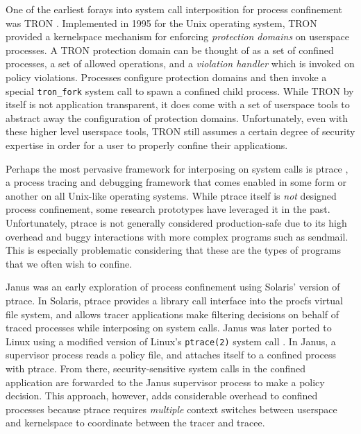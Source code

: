 \documentclass[dvipsnames, 12pt]{article}
\begin{document}
One of the earliest forays into system call interposition for process
confinement was TRON \cite{berman1995_tron}. Implemented in 1995 for the Unix
operating system, TRON provided a kernelspace mechanism for enforcing
\textit{protection domains} on userspace processes. A TRON protection domain can
be thought of as a set of confined processes, a set of allowed operations, and
a \textit{violation handler} which is invoked on policy violations. Processes
configure protection domains and then invoke a special \texttt{tron\_fork}
system call to spawn a confined child process. While TRON by itself is not
application transparent, it does come with a set of userspace tools to abstract
away the configuration of protection domains. Unfortunately, even with these
higher level userspace tools, TRON still assumes a certain degree of security
expertise in order for a user to properly confine their applications.

Perhaps the most pervasive framework for interposing on system calls is ptrace
\cite{padala2002_ptrace}, a process tracing and debugging framework that comes
enabled in some form or another on all Unix-like operating systems.  While
ptrace itself is \textit{not} designed process confinement, some research
prototypes \cite{goldberg96_janus, wagner1999_janus} have leveraged it in the
past. Unfortunately, ptrace is not generally considered production-safe due to
its high overhead and buggy interactions with more complex programs such as
sendmail. This is especially problematic considering that these are the types of
programs that we often wish to confine.

Janus \cite{goldberg96_janus,wagner1999_janus} was an early exploration of
process confinement using Solaris' version of ptrace. In Solaris, ptrace
provides a library call interface into the procfs virtual file system, and
allows tracer applications make filtering decisions on behalf of traced
processes while interposing on system calls. Janus was later ported to Linux
using a modified version of Linux's \texttt{ptrace(2)} system call
\cite{wagner1999_janus}. In Janus, a supervisor process reads a policy file, and
attaches itself to a confined process with ptrace. From there,
security-sensitive system calls in the confined application are forwarded to the
Janus supervisor process to make a policy decision. This approach, however, adds
considerable overhead to confined processes because ptrace requires
\textit{multiple} context switches between userspace and kernelspace to
coordinate between the tracer and tracee.
\end{document}
